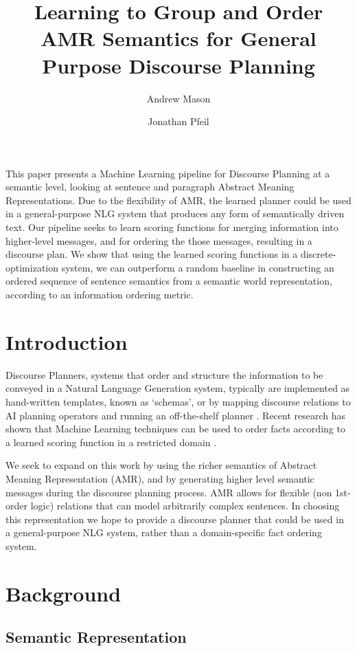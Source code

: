 \documentclass[12pt]{article}
\title{Learning to Group and Order AMR Semantics for General Purpose Discourse Planning}
\author{Andrew Mason \and Jonathan Pfeil}
\begin{document}
\maketitle
\tableofcontents
\listoffigures
\listofalgorithms
\listoftables

\abstract
This paper presents a Machine Learning pipeline for Discourse Planning at a semantic level, looking at sentence and paragraph Abstract Meaning Representations. Due to the flexibility of AMR, the learned planner could be used in a general-purpose NLG system that produces any form of semantically driven text. Our pipeline seeks to learn scoring functions for merging information into higher-level messages, and for ordering the those messages, resulting in a discourse plan. We show that using the learned scoring functions in a discrete-optimization system, we can outperform a random baseline in constructing an ordered sequence of sentence semantics from a semantic world representation, according to an information ordering metric.

\pagebreak

\section{Introduction}
Discourse Planners, systems that order and structure the information to be conveyed in a Natural Language Generation system, typically are implemented as hand-written templates, known as `schemas', or by mapping discourse relations to AI planning operators and running an off-the-shelf planner \cite{applied_nlg}. Recent research has shown that Machine Learning techniques can be used to order facts according to a learned scoring function in a restricted domain \cite{learning_to_order_facts}. 

We seek to expand on this work by using the richer semantics of Abstract Meaning Representation (AMR), and by generating higher level semantic messages during the discourse planning process. AMR allows for flexible (non 1st-order logic) relations that can model arbitrarily complex sentences. In choosing this representation we hope to provide a discourse planner that could be used in a general-purpose NLG system, rather than a domain-specific fact ordering system.

\section{Background}
\subsection{Semantic Representation}
\end{document}
